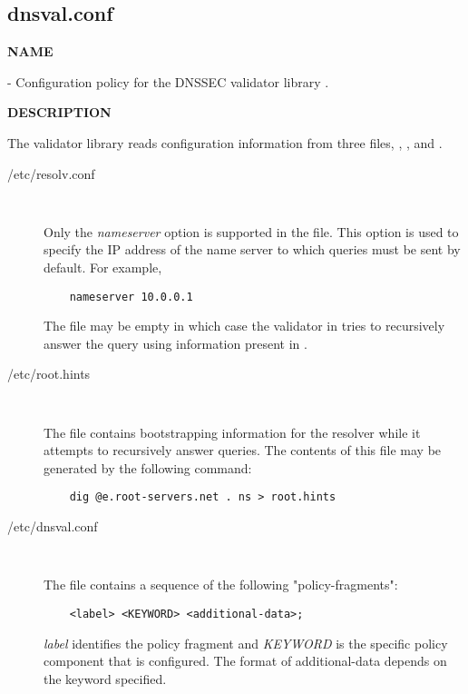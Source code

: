 \clearpage

\subsection{\bf dnsval.conf}

{\bf NAME}

 - Configuration policy for the DNSSEC validator
library .

{\bf DESCRIPTION}

The validator library reads configuration information from three files,
, , and .

\begin{description}

\item [/etc/resolv.conf]\verb" "

Only the {\it nameserver} option is supported in the  file.
This option is used to specify the IP address of the name server to which
queries must be sent by default.  For example,

\begin{verbatim}
    nameserver 10.0.0.1
\end{verbatim}

The  file may be empty in which case the validator in
 tries to recursively answer the query using information
present in .

\item [/etc/root.hints]\verb" "

The  file contains bootstrapping information for the
resolver while it attempts to recursively answer queries.  The contents of
this file may be generated by the following command:

\begin{verbatim}
    dig @e.root-servers.net . ns > root.hints
\end{verbatim}

\item [/etc/dnsval.conf]\verb" "

The  file contains a sequence of the following
"policy-fragments":

\begin{verbatim}
    <label> <KEYWORD> <additional-data>; 
\end{verbatim}

{\it label} identifies the policy fragment 
and {\it KEYWORD} is the specific policy component that is 
configured.  The format of additional-data depends on the 
keyword specified.


\end{description}

